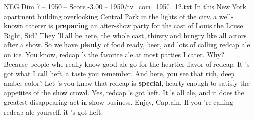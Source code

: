 \begin{textsample}{NEG Dim 7 – 1950 – Score -3.00 – 1950/tv\_com\_1950\_12.txt}  \label{ex:f7_neg_079}
In this New York apartment building overlooking Central Park in the lights of the city, a well-known caterer is \textbf{preparing} an after-show party for the cast of Louis the Louse.
Right, Sid?
They 'll all be here, the whole cast, thirsty and hungry like all actors after a show.
So we have \textbf{plenty} of food ready, beer, and lots of calling redcap ale on ice.
You know, redcap 's the favorite ale at most parties I cater.
Why?
Because people who really know good ale go for the heartier flavor of redcap.
It 's got what I call heft, a taste you remember.
And here, you see that rich, deep amber color?
Let 's you know that redcap is \textbf{special}, hearty enough to satisfy the appetites of the show crowd.
Yes, redcap 's got heft.
It 's all ale, and it does the greatest disappearing act in show business.
Enjoy, Captain.
If you 're calling redcap ale yourself, it 's got heft.

\end{textsample}
